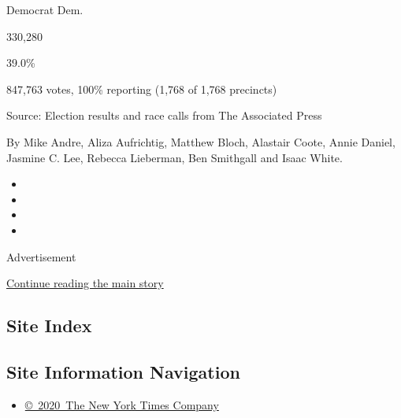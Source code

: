 Democrat Dem.

330,280

39.0\%

847,763 votes, 100\% reporting (1,768 of 1,768 precincts)

Source: Election results and race calls from The Associated Press

By Mike Andre, Aliza Aufrichtig, Matthew Bloch, Alastair Coote, Annie
Daniel, Jasmine C. Lee, Rebecca Lieberman, Ben Smithgall and Isaac
White.

\begin{itemize}
\item
\item
\item
\item
\end{itemize}

Advertisement

\protect\hyperlink{after-bottom}{Continue reading the main story}

\hypertarget{site-index}{%
\subsection{Site Index}\label{site-index}}

\hypertarget{site-information-navigation}{%
\subsection{Site Information
Navigation}\label{site-information-navigation}}

\begin{itemize}
\tightlist
\item
  \href{https://help.nytimes3xbfgragh.onion/hc/en-us/articles/115014792127-Copyright-notice}{©~2020~The
  New York Times Company}
\end{itemize}

